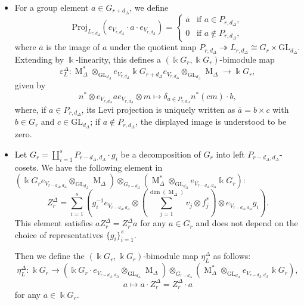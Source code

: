 \documentclass[12pt]{amsart}
\numberwithin{itemcounter}{subsection}
\theoremstyle{plain}
\theoremstyle{definition}
\theoremstyle{remark}
\numberwithin{equation}{section}
\def\k{\Bbbk}
\def\GL{\mathrm{GL}}
\def\M{{\operatorname{M}\nolimits}}
\def\Proj{\mathrm{Proj}}
\DeclareMathOperator*{\ot}{\otimes}
\begin{document}
\begin{itemize}
\item[$(a)$]
For a group element $a\in G_{r+d_\Delta}$, we define
$$
\Proj_{L_{r,d_\Delta}}(e_{V_{r,d_\Delta}} \cdot a\cdot e_{V_{r,d_\Delta}})=
\begin{cases}
\overline{a} & \text{if } a\in P_{r,d_\Delta},\\
0 & \text{if } a\notin P_{r,d_\Delta},
\end{cases}
$$
where $\overline{a}$ is the image of $a$ under the quotient map $P_{r,d_\Delta}\twoheadrightarrow L_{r,d_\Delta}\cong G_r\times \GL_{d_\Delta}.$
Extending by $\k$-linearity, this defines a $(\k G_{r},\k G_{r})$-bimodule map
$$
\varepsilon^\Delta_L: \M^*_\Delta\ot_{\GL_{d_\Delta}}e_{V_{r,d_\Delta}}\k G_{r+d_\Delta} e_{V_{r,d_\Delta}}\ot_{\GL_{d_\Delta}}\M_\Delta\to \k G_r,
$$
given by
$$
n^*\otimes e_{V_{r,d_\Delta}}a e_{V_{r,d_\Delta}}\otimes m \mapsto \delta_{a \in P_{r,d_\Delta}} n^*(c m)\cdot b,
$$
where, if $a\in P_{r,d_\Delta}$, its Levi projection is uniquely written as
$\overline a=b\times c$ with $b\in G_r$ and $c\in\GL_{d_\Delta}$;
if $a\notin P_{r,d_\Delta}$, the displayed image is understood to be zero.

\item[$(b)$]
Let $G_{r}=\coprod\limits_{i=1}^{s}P_{r-d_\Delta,d_\Delta}\cdot g_i$ be a decomposition of $G_{r}$ into left $P_{r-d_\Delta,d_\Delta}$-cosets.
We have the following element in $(\k G_r{e_{V_{r-d_\Delta,d_\Delta}}}\ot_{\GL_{d_\Delta}}
\M_\Delta)\ot_{G_{r-d_\Delta}}
({\M^*_\Delta} \ot_{\GL_{d_\Delta}}  e_{V_{r-d_\Delta,d_\Delta}}\k G_{r}):$
$$
Z^\Delta_r=\sum\limits_{i=1}^s\left(g_i^{-1} e_{V_{r-d_\Delta,d_\Delta}}\otimes \left(\sum_{j=1}^{\dim(\M_\Delta)} v_j\otimes f^*_j\right)\otimes e_{V_{r-d_\Delta,d_\Delta}}g_i\right).
$$
This element satisfies $aZ^\Delta_r=Z^\Delta_ra$ for any $a\in G_{r}$ and does not depend on the choice of representatives $\{g_i\}_{i=1}^{s}$.
\smallskip

Then we define the $(\k G_r , \k G_r )$-bimodule map $\eta^\Delta_L$ as follows:
$$
\eta^\Delta_L: \k G_{r}\to (\k G_{r}\cdot e_{V_{r-d_\Delta,d_\Delta}}\ot_{\GL_{d_\Delta}}
\M_\Delta)\ot_{G_{r-d_\Delta}}(\M^*_\Delta\ot_{\GL_{d_\Delta}} e_{V_{r-d_\Delta,d_\Delta}} \k G_{r}),
$$
$$
a\mapsto a\cdot Z^\Delta_r=Z^\Delta_r \cdot a
$$
for any $a\in  \k G_r .$


\end{itemize}
\end{document}

